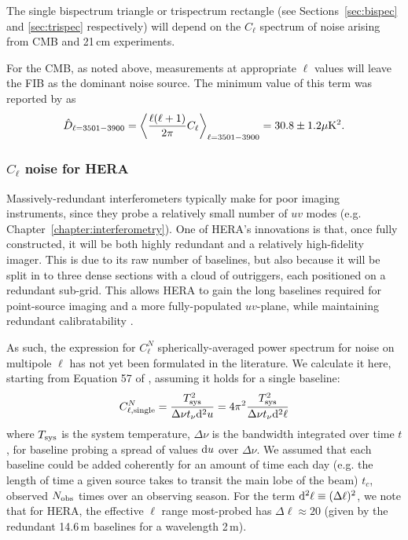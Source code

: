 The single bispectrum triangle or trispectrum rectangle (see Sections~\ref{sec:bispec} and \ref{sec:trispec} respectively) will depend on the $C_{\ell}$ spectrum of noise arising from CMB and 21\,cm experiments. 

For the CMB, as noted above, measurements at appropriate $\ell$ values will leave the FIB as the dominant noise source. The minimum value of this term was reported by \cite{George.15} as 
\begin{equation}
\hat{D}_{\ell = 3501 - 3900} = \left\langle \frac{\ell(\ell+1)}{2\pi}C_{\ell} \right\rangle_{\ell = 3501 - 3900} = 30.8\pm 1.2\mu {\rm K}^2.
\end{equation}

\subsubsection{$C_{\ell}$ noise for HERA}

Massively-redundant interferometers typically make for poor imaging instruments, since they probe a relatively small number of $uv$ modes (e.g. Chapter~\ref{chapter:interferometry}). One of HERA's innovations is that, once fully constructed, it will be both highly redundant and a relatively high-fidelity imager. This is due to its raw number of baselines, but also because it will be split in to three dense sections with a cloud of outriggers, each positioned on a redundant sub-grid. This allows HERA to gain the long baselines required for point-source imaging and a more fully-populated $uv$-plane, while maintaining redundant calibratability \citep{Dillon.16, deBoer.17}.

As such, the expression for $C^N_{\ell}$ spherically-averaged power spectrum for noise on multipole $\ell$ has not yet been formulated in the literature. We calculate it here, starting from Equation 57 of \cite{Zaldarriaga.04}, assuming it holds for a single baseline:
\begin{equation}
C^N_{\ell, {\rm single}} = \frac{T_{\rm sys}^2}{\Delta\nu t_{\nu} {\rm d}^2 u} = 4\pi^2 \frac{T_{\rm sys}^2}{\Delta\nu t_{\nu} {\rm d}^2 \ell}
\end{equation}
where $T_{\rm sys}$ is the system temperature, $\Delta\nu$ is the bandwidth integrated over time $t$, for baseline probing a spread of values ${\rm d}u$ over $\Delta\nu$.
We assumed that each baseline could be added coherently for an amount of time each day (e.g. the length of time a given source takes to transit the main lobe of the beam) $t_c$, observed $N_{\rm obs}$ times over an observing season. 
For the term ${\rm d}^2\ell \equiv (\Delta\ell)^2$, we note that for HERA, the effective $\ell$ range most-probed has $\Delta\ell\approx 20$ (given by the redundant 14.6\,m baselines for a wavelength 2\,m). 

